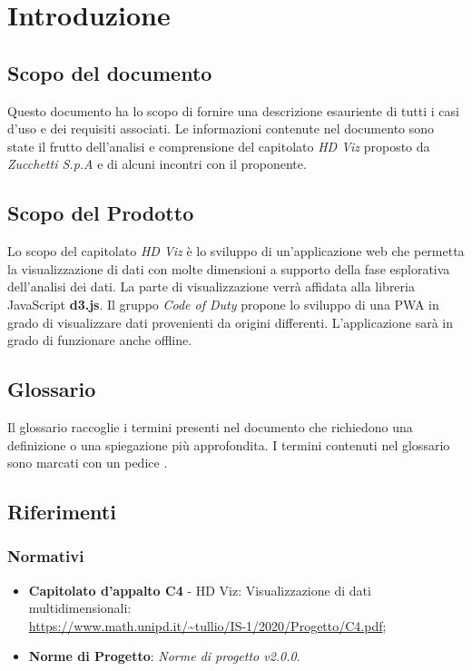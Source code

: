 \section{Introduzione}
    \subsection{Scopo del documento}
    Questo documento ha lo scopo di fornire una descrizione esauriente di tutti i casi d'uso e dei requisiti associati. Le informazioni contenute nel documento sono state il frutto dell'analisi e comprensione del capitolato \emph{HD Viz} proposto da \emph{Zucchetti S.p.A} e di alcuni incontri con il proponente.
    \subsection{Scopo del Prodotto}
    Lo scopo del capitolato \emph{HD Viz} è lo sviluppo di un'applicazione web che permetta la visualizzazione di dati con molte dimensioni a supporto della fase esplorativa dell'analisi dei dati. La parte di visualizzazione verrà affidata alla libreria JavaScript \textbf{d3.js}. Il gruppo \emph{Code of Duty} propone lo sviluppo di una PWA in grado di visualizzare dati provenienti da origini differenti. L'applicazione sarà in grado di funzionare anche offline.
    \subsection{Glossario}
    Il glossario raccoglie i termini presenti nel documento che richiedono una definizione o una spiegazione più approfondita. I termini contenuti nel glossario sono marcati con un pedice \glo{}.
    \subsection{Riferimenti}
    \subsubsection{Normativi}
    \begin{itemize}
        \item \textbf{Capitolato d'appalto C4} - HD Viz: Visualizzazione di dati multidimensionali:\\\url{https://www.math.unipd.it/~tullio/IS-1/2020/Progetto/C4.pdf};
        \item \textbf{Norme di Progetto}: \emph{Norme di progetto v2.0.0}.
    \end{itemize}
